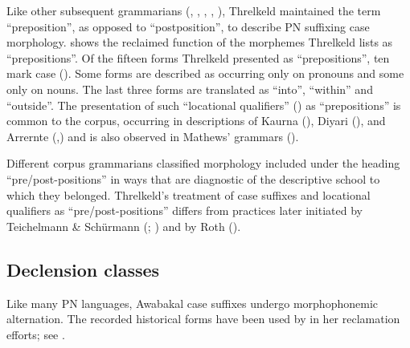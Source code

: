 Like other subsequent grammarians (\citealt[492]{hale_languages_1846}, \citealt[27]{roth_structure_1901}, \citealt[19]{hey_elementary_1903}, \citealt[8]{taplin_grammar_1880}, \citealt[13--17]{meyer_vocabulary_1843}), Threlkeld maintained the term ``preposition'', as opposed to “postposition”, to describe PN suffixing case morphology.  shows the reclaimed function of the morphemes Threlkeld lists as ``prepositions''. Of the fifteen forms Threlkeld presented as ``prepositions'', ten mark case (). Some forms are described as occurring only on pronouns and some only on nouns. The last three forms are translated as “into”, “within” and “outside”. The presentation of such “locational qualifiers” (\citealt[282]{dixon_languages_1980}) as “prepositions” is common to the corpus, occurring in descriptions of Kaurna (), Diyari (), and Arrernte (,) and is also observed in Mathews' grammars (\citealt[204]{koch_r_2008}).

Different corpus grammarians classified morphology included under the heading “pre/post-positions” in ways that are diagnostic of the descriptive school to which they belonged. Threlkeld’s treatment of case suffixes and locational qualifiers as “pre/post-positions” differs from practices later initiated by Teichelmann \& Schürmann (\citeyear{teichelmann_outlines_1840}; ) and by Roth ().


\largerpage
\subsection{Declension classes}
\label{sec:key:3.3.5}

Like many PN languages, Awabakal case suffixes undergo morphophonemic alternation. The recorded historical forms have been used by \citet[26]{lissarrague_salvage_2006} in her reclamation efforts; see .

